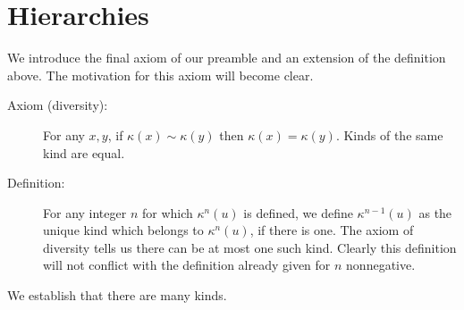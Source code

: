 \documentclass[12pt]{article}
\begin{document}
\newpage

\section{Hierarchies}






We introduce the final axiom of our preamble and an extension of the definition above.  The motivation for this axiom will become clear.

\begin{description}

\item[Axiom (diversity):]  For any $x,y$, if $\kappa(x)\sim \kappa(y)$ then $\kappa(x)=\kappa(y)$.  Kinds of the same kind are equal.

\item[Definition:]  For any integer $n$ for which $\kappa^n(u)$ is defined, we define $\kappa^{n-1}(u)$
as the unique kind which belongs to $\kappa^n(u)$, if there is one.  The axiom of diversity tells us there can be at most one such kind.  Clearly this definition will not conflict with the definition already given for $n$ nonnegative.

\end{description}

We establish that there are many kinds.
\end{document}
